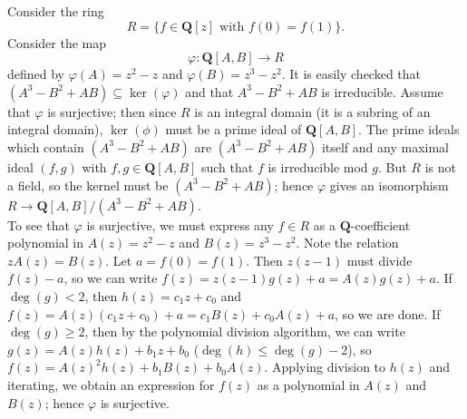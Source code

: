 \begin{example}
\label{example-affine-open-not-standard}
Consider the ring
$$
R = \{ f \in \mathbf{Q}[z]\text{ with }f(0) = f(1) \}.
$$
Consider the map
$$
\varphi : \mathbf{Q}[A, B]\to R
$$
defined by $\varphi(A) = z^2-z$ and $\varphi(B) = z^3-z^2$.  It is
easily checked that $(A^3-B^2 + AB)\subseteq\ker(\varphi)$ and that
$A^3-B^2 + AB$ is irreducible.  Assume that $\varphi$ is surjective;
then since $R$ is an integral domain (it is a subring of an integral
domain), $\ker(\phi)$ must be a prime ideal of $\mathbf{Q}[A, B]$.
The prime ideals which contain $(A^3-B^2 + AB)$ are $(A^3-B^2 + AB)$
itself and any maximal ideal $(f, g)$ with $f, g\in\mathbf{Q}[A, B]$
such that $f$ is irreducible mod $g$. But $R$ is not a field, so the
kernel must be $(A^3-B^2 + AB)$; hence $\varphi$ gives an isomorphism
$R\to\mathbf{Q}[A, B]/(A^3-B^2 + AB)$.\\
\indent To see that $\varphi$ is surjective, we must express any
$f\in R$ as a $\mathbf{Q}$-coefficient polynomial in $A(z) = z^2-z$
and $B(z) = z^3-z^2$. Note the relation $zA(z) = B(z)$. Let
$a = f(0) = f(1)$. Then $z(z-1)$ must divide $f(z)-a$, so we can write
$f(z) = z(z-1)g(z)+a = A(z)g(z)+a$.  If $\deg(g)<2$, then
$h(z) = c_1z + c_0$ and $f(z) = A(z)(c_1z + c_0)+a = c_1B(z)+c_0A(z)+a$, so we
are done.  If $\deg(g)\geq 2$, then by the polynomial division
algorithm, we can write $g(z) = A(z)h(z)+b_1z + b_0$
($\deg(h)\leq\deg(g)-2$), so $f(z) = A(z)^2h(z)+b_1B(z)+b_0A(z)$.
Applying division to $h(z)$ and iterating, we obtain an expression
for $f(z)$ as a polynomial in $A(z)$ and $B(z)$; hence $\varphi$ is
surjective.


\end{example}
